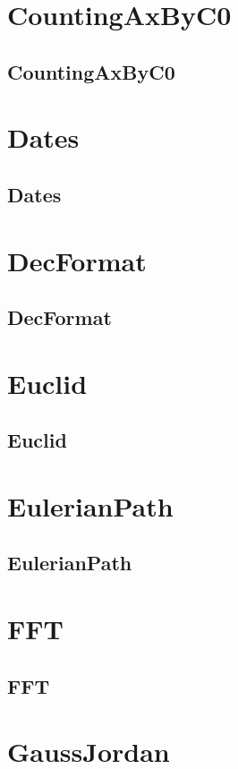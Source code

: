 \documentclass[a4paper, twocolumn]{article}
\begin{document}
\section{CountingAxByC0}
\subsection{CountingAxByC0}

\section{Dates}
\subsection{Dates}

\section{DecFormat}
\subsection{DecFormat}

\section{Euclid}
\subsection{Euclid}

\section{EulerianPath}
\subsection{EulerianPath}

\section{FFT}
\subsection{FFT}

\section{GaussJordan}
\end{document}
